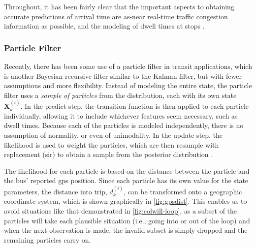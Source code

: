 \documentclass[12pt,a4paper]{article}
\newcommand{\bX}{\mathbf{X}}
\newcommand{\kf}{Kalman filter}
\newcommand{\pf}{particle filter}
\begin{document}
Throughout, it has been fairly clear that the important aspects to obtaining
accurate predictions of arrival time are as-near real-time traffic congestion information
as possible, and the modeling of dwell times at stops \citep{cn}.



\subsubsection{Particle Filter}
\label{sec:particle-filter}

Recently, there has been some use of a \pf{} in transit applications,
which is another Bayesian recursive filter similar to the \kf{},
but with fewer assumptions and more flexibility.
Instead of modeling the entire state,
the \pf{} uses a \emph{sample of particles} from the distribution,
each with its own state $\bX_k^{(i)}$.
In the predict step, 
the transition function is then applied to each particle individually,
allowing it to include whichever features seem necessary,
such as dwell times.
Because each of the particles is modeled independently,
there is no assumption of normality, or even of unimodality.
In the update step, the likelihood is used to weight the particles,
which are then resample with replacement (\gls{sir}) to obtain a 
sample from the posterior distribution
\citep{gordon-etal:1993}.


The likelihood for each particle is based on the distance between the particle
and the bus' reported \gls{gps} position.
Since each particle has its own value for the state parameters,
the distance into trip, $d_k^{(i)}$, can be transformed onto a geographic coordinate system,
which is shown graphically in \cref{fig:gpsdist}.
This enables us to avoid situations like that demonstrated in \cref{fig:colwill-loop},
as a subset of the particles will take each plausible situation
(i.e., going into or out of the loop) and when  the next observation is made,
the invalid subset is simply dropped and the remaining particles carry on.
\end{document}
